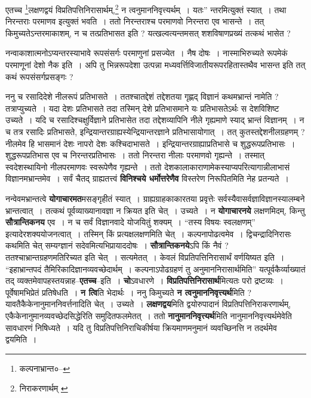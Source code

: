 \documentclass[article,12pt,a4paper]{memoir}
\begin{document}
	एतच्च \footnote{कल्पनाभ्रान्त०--\cite{dp-msD-n}}\-लक्षणद्वयं विप्रतिपत्तिनिरासार्थम्,\footnote{निराकरणार्थम् \cite{dp-msA} \cite{dp-msC} \cite{dp-edP} \cite{dp-edE} \cite{dp-edH} \cite{dp-edN}} न त्वनुमाननिवृत्त्यर्थम् । यतः” न्तरमित्युक्तं स्यात् । तथा निरन्तराः परमाणव इत्युक्तं भवति । ततो निरन्तराश्च परमाणवो निरन्तरा एव भासन्ते । तत् किमुच्यतेऽन्तरमाकाशम्, न च तत्प्रतिभासत इति ? यत्खल्वत्यन्तमसत् शशविषाणप्रख्यं तत्कथं भासेत ?
	\pend
      

	  \pstart नन्वाकाशात्मनोऽप्यन्तरस्याभावे रूपसंसर्गः परमाणुनां प्रसज्येत । नैष दोषः । नास्माभिरुच्यते रूपमेकं परमाणूनां देशो नैक इति । अपि तु भिन्नरूपदेशा उत्पन्ना मध्यवर्त्तिविजातीयरूपरहितास्तथैव भासन्त इति तत् कथं रूपसंसर्गप्रसङ्गः ?
	\pend
      

	  \pstart ननु च रसादिदेशे नीलरूपं प्रतिभासते । ततश्चातद्देशं तद्देशतया गृह्णद् विज्ञानं कथमभ्रान्तं नामेति ? तत्राप्युच्यते । यदा देशः प्रतिभासते तदा तस्मिन् देशे प्रतिभासमाने यः प्रतिभासतेऽर्थः स देशविशिष्ट उच्यते । यदि च रसादिश्चक्षुर्विज्ञाने प्रतिभासेत तदा तद्देशव्यापिनि नीले गृह्यमाणे स्याद् भ्रान्तं विज्ञानम् । न च तत्र रसादिः प्रतिभासते, इन्द्रियान्तरग्राह्यस्येन्द्रियान्तरज्ञाने प्रतिभासायोगात् । तत् कुतस्तद्देशनीलग्रहणम् ? नीलमेव हि भासमानं देशः नापरो देशः कश्चिदाभासते । इन्द्रियान्तरग्राह्याप्रतिभासे च शुद्धरूपप्रतिभासः । शुद्धरूपप्रतिभास एव च निरन्तरप्रतिभासः । ततो निरन्तरा नीलाः परमाणवो गृह्यन्ते । तस्मात् स्वदेशस्थायिनो नीलपरमाणवः स्वरूपेणैव गृह्यन्ते । ततो देशकालाकाराणामेकस्याप्यपरित्यागान्नीलाभासं विज्ञानमभ्रान्तमेव । सर्वं चैतद् ग्राह्यतत्त्वं \textbf{विनिश्चये धर्मोत्तरेणैव} विस्तरेण निरूपितमिति नेह प्रतन्यते ।
	\pend
      

	  \pstart नन्वेवमभ्रान्तत्वे \textbf{योगाचारमत}मसङ्गृहीतं स्यात् । ग्राह्यग्राहकाकारतया प्रवृत्तेः सर्वस्यैवासर्वज्ञाविज्ञानस्यालम्बने भ्रान्तत्वात् । तत्कथं पूर्वव्याख्यानावज्ञा न क्रियत इति चेत् । उच्यते । न \textbf{योगाचारनये} लक्षणमिदम्, किन्तु \textbf{सौत्रान्तिकनय} एव । न च सर्वं विज्ञानवादे योजयि\leavevmode{}तुं शक्यम् । “तस्य विषयः स्वलक्षणम्” इत्यादेरशक्ययोजनत्वात् । तस्मिन् किं प्रत्यक्षलक्षणमिति चेत् । कल्पनापोढत्वमेव । द्विचन्द्रादिनिरासः कथमिति चेत् सम्यग्ज्ञानं सदेवमित्यभिप्रायाददोषः । \textbf{सौत्रान्तिकनये}ऽपि किं नैवं ? ततश्चाभ्रान्तग्रहणमतिरिच्यत इति चेत् । सत्यमेतत् । केवलं विप्रतिपत्तिनिरासार्थं वर्णयिष्यत इति । “इहाभ्रान्तपदं तैमिरिकादिज्ञानव्यवच्छेदार्थम् । कल्पनाऽपोढग्रहणं तु अनुमाननिरासार्थमिति” यत्पूर्वकैर्व्याख्यातं तद् व्यक्तमेवापहस्तयन्नाह--\textbf{एतच्च}--इति । \textbf{चो}ऽवधारणे । \textbf{विप्रतिपत्तिनिरासार्थ}मित्यतः परो द्रष्टव्यः । पूर्वेषामभिप्रेतं प्रतिषेधति । \textbf{न त्वि}ति भेदार्थः । ननु किमुच्यते \textbf{न त्वनुमाननिवृत्त्यर्थ}मिति ? यावतैकैकेनानुमाननिवर्त्तनादिति चेत् । उच्यते । \textbf{लक्षणद्वय}मिति द्वयोरुपादानं विप्रतिपत्तिनिराकरणार्थम्, एकैकेनानुमानव्यवच्छेदसिद्धेरिति समुदितफलमेतत् । ततो \textbf{नानुमाननिवृत्त्यर्थ}मिति नानुमाननिवृत्त्यर्थमेवेति सावधारणं निषिध्यते । यदि तु विप्रतिपत्तिनिराचिकीर्षया क्रियमाणमनुमानं व्यवच्छिनत्ति न तदर्थमेव द्वयमिति ।
	\pend
      
\end{document}
